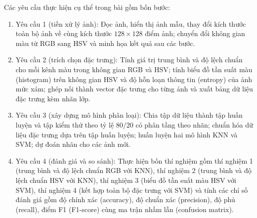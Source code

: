 \documentclass[12pt,a4paper]{article}
\begin{document}
Các yêu cầu thực hiện cụ thể trong bài gồm bốn bước:
\begin{enumerate}
    \item Yêu cầu 1 (tiền xử lý ảnh): Đọc ảnh, hiển thị ảnh mẫu, thay đổi kích thước toàn bộ ảnh về cùng kích thước $128 \times 128$ điểm ảnh; chuyển đổi không gian màu từ RGB sang HSV và minh họa kết quả sau các bước.
    \item Yêu cầu 2 (trích chọn đặc trưng): Tính giá trị trung bình và độ lệch chuẩn cho mỗi kênh màu trong không gian RGB và HSV; tính biểu đồ tần suất màu (histogram) trên không gian HSV và độ hỗn loạn thông tin (entropy) của ảnh mức xám; ghép nối thành vector đặc trưng cho từng ảnh và xuất bảng dữ liệu đặc trưng kèm nhãn lớp.
    \item Yêu cầu 3 (xây dựng mô hình phân loại): Chia tập dữ liệu thành tập huấn luyện và tập kiểm thử theo tỷ lệ $80/20$ có phân tầng theo nhãn; chuẩn hóa dữ liệu đặc trưng dựa trên tập huấn luyện; huấn luyện hai mô hình KNN và SVM; dự đoán nhãn cho các ảnh mới.
    \item Yêu cầu 4 (đánh giá và so sánh): Thực hiện bốn thí nghiệm gồm thí nghiệm 1 (trung bình và độ lệch chuẩn RGB với KNN), thí nghiệm 2 (trung bình và độ lệch chuẩn HSV với KNN), thí nghiệm 3 (biểu đồ tần suất màu HSV với SVM), thí nghiệm 4 (kết hợp toàn bộ đặc trưng với SVM) và tính các chỉ số đánh giá gồm độ chính xác (accuracy), độ chuẩn xác (precision), độ phủ (recall), điểm F1 (F1-score) cùng ma trận nhầm lẫn (confusion matrix).
\end{enumerate}
\end{document}
